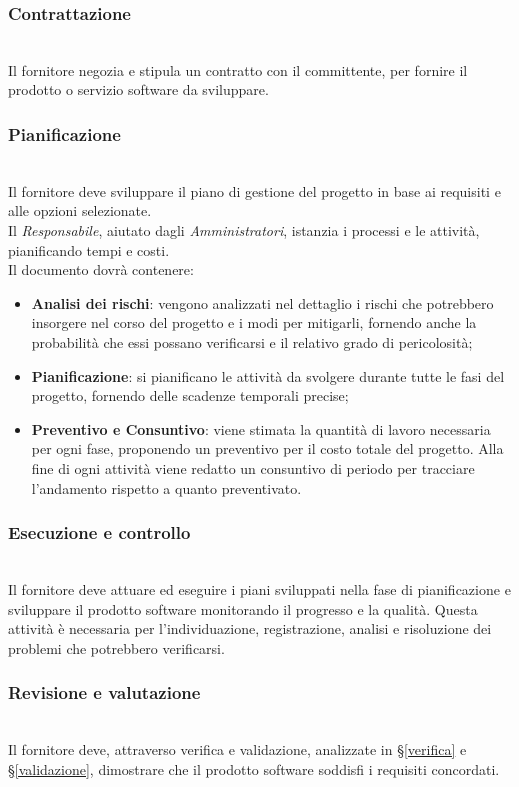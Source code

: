 \subsubsection{Contrattazione} \-\\
Il fornitore negozia e stipula un contratto con il committente, per fornire il prodotto o servizio software da sviluppare.

\subsubsection{Pianificazione} \-\\
Il fornitore deve sviluppare il piano di gestione del progetto in base ai requisiti e alle opzioni selezionate. \\ 
Il \textit{Responsabile}, aiutato dagli \textit{Amministratori}, istanzia i processi e le attività, pianificando tempi e costi. \\
Il documento dovrà contenere:
\begin{itemize}
	\item \textbf{Analisi dei rischi}: vengono analizzati nel dettaglio i rischi che potrebbero insorgere nel corso del progetto e i modi per mitigarli, fornendo anche la probabilità che essi possano verificarsi e il relativo grado di pericolosità; 
	\item \textbf{Pianificazione}: si pianificano le attività da svolgere durante tutte le fasi del progetto, fornendo delle scadenze temporali precise;
	\item \textbf{Preventivo e Consuntivo}:  viene stimata la quantità
	di lavoro necessaria per ogni fase, proponendo un preventivo per il costo totale
	del progetto. Alla fine di ogni attività viene redatto un consuntivo di periodo
	per tracciare l’andamento rispetto a quanto preventivato.
	
\end{itemize}

\subsubsection{Esecuzione e controllo} \-\\
Il fornitore deve attuare ed eseguire i piani sviluppati nella fase di 
pianificazione e sviluppare il prodotto software monitorando il progresso e la 
qualità. Questa attività è necessaria per l'individuazione, registrazione, analisi e risoluzione dei problemi che potrebbero verificarsi.

\subsubsection{Revisione e valutazione} \-\\
Il fornitore deve, attraverso verifica e validazione, analizzate in §\ref{verifica} e §\ref{validazione},  dimostrare che 
il prodotto software soddisfi i requisiti concordati.

